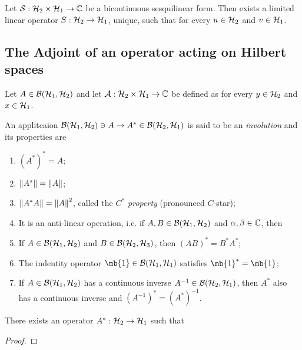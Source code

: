 \documentclass[oneside, 10pt, notitlepage]{book}
\begin{document}
\begin{proposition}
	Let \(\mathcal{S}:\mathcal{H}_2\times \mathcal{H}_1\to \mathbb{C}\) be a bicontinuous sesquilinear form. Then exists a limited linear operator \(S:\mathcal{H}_2 \to \mathcal{H}_1\), unique, such that
	for every \(u\in\mathcal{H}_2\) and \(v\in\mathcal{H}_1\).
\end{proposition}

\subsection{The Adjoint of an operator acting on Hilbert spaces}

\begin{definition}
	Let \(A\in \mathcal{B}(\mathcal{H}_1,\mathcal{H}_2)\) and let \(\mathcal{A}:\mathcal{H}_2\times \mathcal{H}_1 \to \mathbb{C}\) be defined as
	for every \(y\in\mathcal{H}_2\) and \(x\in\mathcal{H}_1\).
\end{definition}

\begin{definition}
	An applitcaion \(\mathcal{B}(\mathcal{H}_1,\mathcal{H}_2)\ni A \to A^* \in \mathcal{B}(\mathcal{H}_2,\mathcal{H}_1)\) is said to be an \emph{involution} and its properties are
	\begin{enumerate}
		\item \((A^*)^* = A\);
		\item \(\norm{A^*} = \norm{A}\);
		\item \(\norm{A^* A} = \norm{A}^2\), called the \emph{\(C^*\) property} (pronounced \(C\)-star);
		\item It is an anti-linear operation, i.e. if \(A,B\in \mathcal{B}(\mathcal{H}_1,\mathcal{H}_2)\) and \(\alpha,\beta\in\mathbb{C}\), then
		\item If \(A\in \mathcal{B}(\mathcal{H}_1,\mathcal{H}_2)\) and \(B\in\mathcal{B}(\mathcal{H}_2,\mathcal{H}_3)\), then \((AB)^* = B^* A^*\);
		\item The indentity operator \(\mb{1}\in\mc{B}(\mc{H}_1,\mc{H}_1)\) satisfies \(\mb{1}^* = \mb{1}\);
		\item If \(A\in\mathcal{B}(\mathcal{H}_1,\mathcal{H}_2)\) has a continuous inverse \(A^{-1}\in\mathcal{B}(\mathcal{H}_2,\mathcal{H}_1)\), then \(A^*\) also has a continuous inverse and \((A^{-1})^* = (A^*)^{-1}\).
	\end{enumerate}
\end{definition}

\begin{proposition}
	There exists an operator \(A^*:\mathcal{H}_2\to\mathcal{H}_1\) such that
\end{proposition}
\begin{proof}

\end{proof}




























\end{document}
